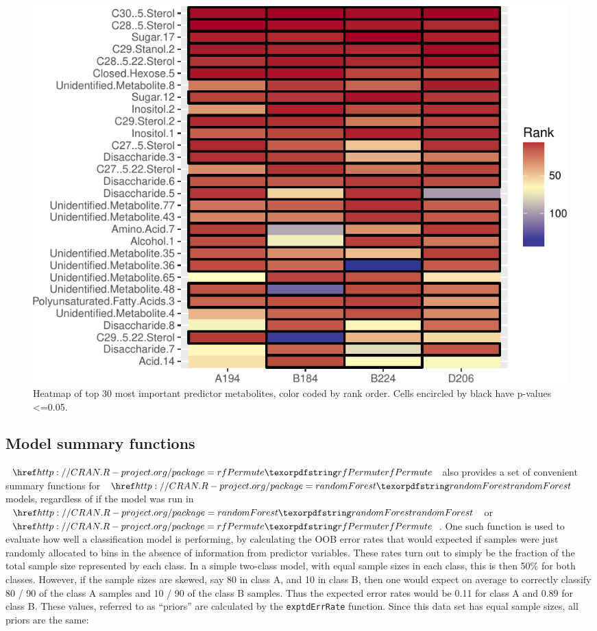 \begin{Schunk}
\begin{figure}
\includegraphics{archer_files/figure-latex/impHeatmap-1} \caption[Heatmap of top 30 most important predictor metabolites, color coded by rank order]{Heatmap of top 30 most important predictor metabolites, color coded by rank order. Cells encircled by black have p-values <=0.05.}\label{fig:impHeatmap}
\end{figure}
\end{Schunk}

\subsection{Model summary functions}\label{model-summary-functions}

\(\CRANpkg{rfPermute}\) also provides a set of convenient summary
functions for \(\CRANpkg{randomForest}\) models, regardless of if the
model was run in \(\CRANpkg{randomForest}\) or \(\CRANpkg{rfPermute}\).
One such function is used to evaluate how well a classification model is
performing, by calculating the OOB error rates that would expected if
samples were just randomly allocated to bins in the absence of
information from predictor variables. These rates turn out to simply be
the fraction of the total sample size represented by each class. In a
simple two-class model, with equal sample sizes in each class, this is
then 50\% for both classes. However, if the sample sizes are skewed, say
80 in class A, and 10 in class B, then one would expect on average to
correctly classify 80 / 90 of the class A samples and 10 / 90 of the
class B samples. Thus the expected error rates would be 0.11 for class A
and 0.89 for class B. These values, referred to as ``priors'' are
calculated by the \texttt{exptdErrRate} function. Since this data set
has equal sample sizes, all priors are the same:

